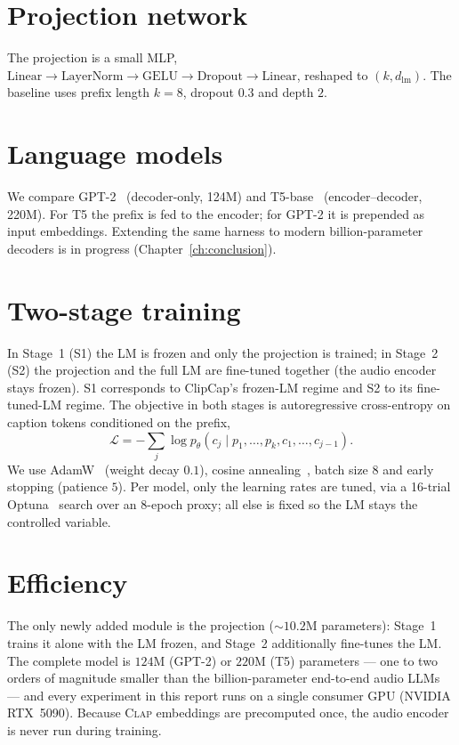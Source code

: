 \documentclass[9pt]{report}
\newcommand{\clapenc}{\textsc{Clap}}
\begin{document}
\section{Projection network}
The projection is a small MLP,
$\text{Linear}\!\rightarrow\!\text{LayerNorm}\!\rightarrow\!\text{GELU}\!\rightarrow\!
\text{Dropout}\!\rightarrow\!\text{Linear}$, reshaped to $(k,d_{\text{lm}})$. The baseline uses
prefix length $k{=}8$, dropout $0.3$ and depth $2$.

\section{Language models}
We compare GPT-2~\cite{radford2019gpt2} (decoder-only, 124M) and T5-base~\cite{raffel2020t5}
(encoder--decoder, 220M). For T5 the prefix is fed to the encoder; for GPT-2 it is prepended as
input embeddings. Extending the same harness to modern billion-parameter decoders is in progress
(Chapter~\ref{ch:conclusion}).

\section{Two-stage training}
In Stage~1 (S1) the LM is frozen and only the projection is trained; in Stage~2 (S2) the
projection and the full LM are fine-tuned together (the audio encoder stays frozen). S1
corresponds to ClipCap's frozen-LM regime and S2 to its fine-tuned-LM regime. The objective in
both stages is autoregressive cross-entropy on caption tokens conditioned on the prefix,
\[
  \mathcal{L} = -\sum_{j}\log p_\theta\!\left(c_j \mid p_1,\dots,p_k, c_1,\dots,c_{j-1}\right).
\]
We use AdamW~\cite{loshchilov2019adamw} (weight decay $0.1$), cosine
annealing~\cite{loshchilov2017sgdr}, batch size $8$ and early stopping
(patience $5$). Per model, only the learning rates are tuned, via a 16-trial
Optuna~\cite{akiba2019optuna} search over an 8-epoch proxy; all else is fixed so the LM stays
the controlled variable.

\section{Efficiency}
The only newly added module is the projection ($\sim$$10.2$M parameters): Stage~1 trains it
alone with the LM frozen, and Stage~2 additionally fine-tunes the LM. The complete model is
$124$M (GPT-2) or $220$M (T5) parameters --- one to two orders of magnitude smaller than the
billion-parameter end-to-end audio LLMs --- and every experiment in this report runs on a
single consumer GPU (NVIDIA RTX~5090). Because \clapenc{} embeddings are precomputed once,
the audio encoder is never run during training.
\end{document}
